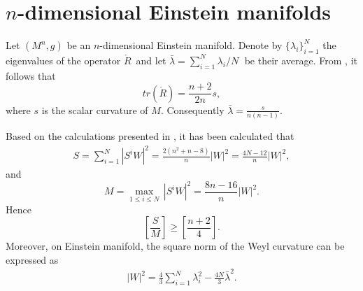 \documentclass[11pt, reqno]{amsart}
\numberwithin{equation}{section}
\theoremstyle{definition}
\begin{document}
	\section{$n$-dimensional Einstein manifolds}
	Let $(M^n ,g)$ be an $n$-dimensional Einstein manifold. Denote by $\{\lambda_{i}\}_{i=1}^{N}$ the eigenvalues of the operator   $\mathring{R}\,$ and let $\bar{\lambda}=\sum\nolimits_{i=1}^{N}{{\lambda }_i}/{N}\;$ be their average. From \cite{Li4}, it follows that $$tr(\mathring{R})=\frac{n+2}{2n}s,$$
	where $s$ is the scalar curvature of $M$. Consequently $\bar{\lambda}=\frac{s}{n(n-1)}$.
	
	Based on the calculations presented in \cite{DF}, it has been calculated that
	\begin{eqnarray}
		S=\sum\limits_{i=1}^{N}{{{\left| {{S}^{i}}W \right|}^{2}}}=\frac{2({{n}^{2}}+n-8)}{n}{{\left| W \right|}^{2}}=\frac{4N-12}{n}{{\left| W \right|}^{2}},\label{1}
	\end{eqnarray}
	and $$M =\underset{1\le i\le N}{\mathop{\max }}\,{\left| S^{i}W \right|^2}=\frac{8n-16}{n}{{\left| W \right|}^{2}}.$$ 
	Hence 
	$$[\frac{S}{M}]\ge [\frac{n+2}{4}].$$
	Moreover, on Einstein manifold, the square norm of the Weyl curvature can be expressed as 
	\begin{eqnarray}
		{{\left| W \right|}^{2}}=\frac{4}{3}\sum\limits_{i=1}^{N}{\lambda _{i}^{2}}-\frac{4N}{3}{{\bar{\lambda }}^{2}}.\label{2}
	\end{eqnarray}
	
\end{document}
